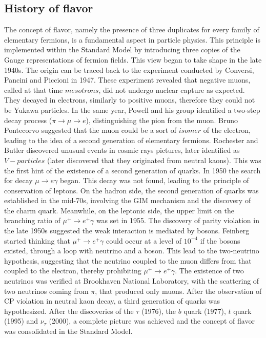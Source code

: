 \subsection{History of flavor}
The concept of flavor, namely the presence of three duplicates for every family of elementary fermions, is a fundamental aspect in particle physics. 
This principle is implemented within the Standard Model by introducing three copies of the Gauge representations of fermion fields. This view began 
to take shape in the late 1940s. The origin can be traced back to the experiment conducted by Conversi, Pancini and Piccioni in 1947. These experiment 
revealed that negative muons, called at that time $mesotrons$, did not undergo nuclear capture as expected. They decayed in electrons, similarly to positive muons, 
therefore they could not be Yukawa particles. In the same year, Powell and his group identified a two-step decay process ($\pi \rightarrow \mu \rightarrow e$), 
distinguishing the pion from the muon. Bruno Pontecorvo suggested that the muon could be a sort of $isomer$ of the electron, leading to the idea of a second 
generation of elementary fermions. Rochester and Butler discovered unusual events in cosmic rays pictures, later identified as $V-particles$ (later 
discovered that they originated from neutral kaons). This was the first hint of the existence of a second generation of quarks. In 1950 the search 
for decay $\mu \rightarrow e \gamma$ began. This decay was not found, leading to the principle of conservation of leptons. On the hadron side, 
the second generation of quarks was established in the mid-70s, involving the GIM mechanism and the discovery of the charm quark. Meanwhile, 
on the leptonic side, the upper limit on the branching ratio of $\mu^+ \rightarrow  e^+ \gamma$ was set in 1955. The discovery of parity violation 
in the late 1950s suggested the weak interaction is mediated by bosons. Feinberg started thinking that $\mu^+ \rightarrow  e^+ \gamma$ could occur 
at a level of $10^{-4}$ if the bosons existed, through a loop with neutrino and a boson. This lead to the two-neutrino hypothesis, suggesting that 
the neutrino coupled to the muon differs from that coupled to the electron, thereby prohibiting $\mu^+ \rightarrow  e^+ \gamma$. The existence of 
two neutrinos was verified at Brookhaven National Laboratory, with the scattering of two neutrinos coming from $\pi$, that produced only muons. 
After the observation of CP violation in neutral kaon decay, a third generation of quarks was hypothesized. After the discoveries of the $\tau$ (1976), 
the $b$ quark (1977), $t$ quark (1995) and $\nu_{\tau}$ (2000), a complete picture was achieved and the concept of flavor was consolidated in the Standard Model.


